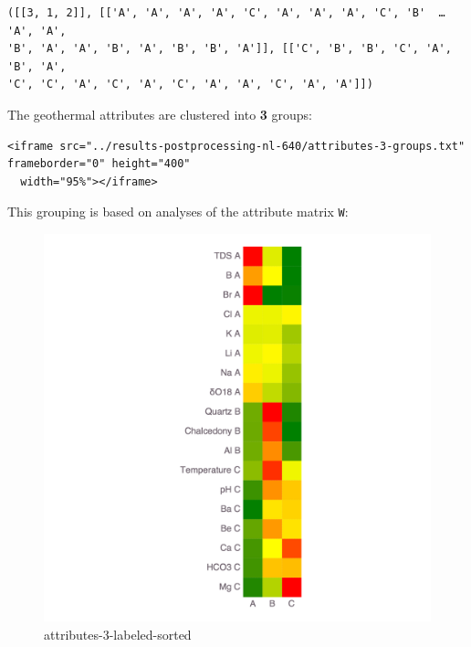 \documentclass[11pt]{article}
\makeatletter
\newcommand{\boxspacing}{\kern\kvtcb@left@rule\kern\kvtcb@boxsep}
\newcommand{\prompt}[4]{
        {\ttfamily\llap{{\color{#2}[#3]:\hspace{3pt}#4}}\vspace{-\baselineskip}}
    }
\makeatother
\begin{document}
            \begin{tcolorbox}[breakable, size=fbox, boxrule=.5pt, pad at break*=1mm, opacityfill=0]
\prompt{Out}{outcolor}{18}{\boxspacing}
\begin{Verbatim}[commandchars=\\\{\}]
([[3, 1, 2]], [['A', 'A', 'A', 'A', 'C', 'A', 'A', 'A', 'C', 'B'  …  'A', 'A',
'B', 'A', 'A', 'B', 'A', 'B', 'B', 'A']], [['C', 'B', 'B', 'C', 'A', 'B', 'A',
'C', 'C', 'A', 'C', 'A', 'C', 'A', 'A', 'C', 'A', 'A']])
\end{Verbatim}
\end{tcolorbox}
        
    The geothermal attributes are clustered into \textbf{3} groups:

\begin{verbatim}
<iframe src="../results-postprocessing-nl-640/attributes-3-groups.txt" frameborder="0" height="400"
  width="95%"></iframe>
\end{verbatim}

This grouping is based on analyses of the attribute matrix \texttt{W}:

\begin{figure}
\centering
\includegraphics{../figures-postprocessing-nl-640/attributes-3-labeled-sorted.png}
\caption{attributes-3-labeled-sorted}
\end{figure}
\end{document}
